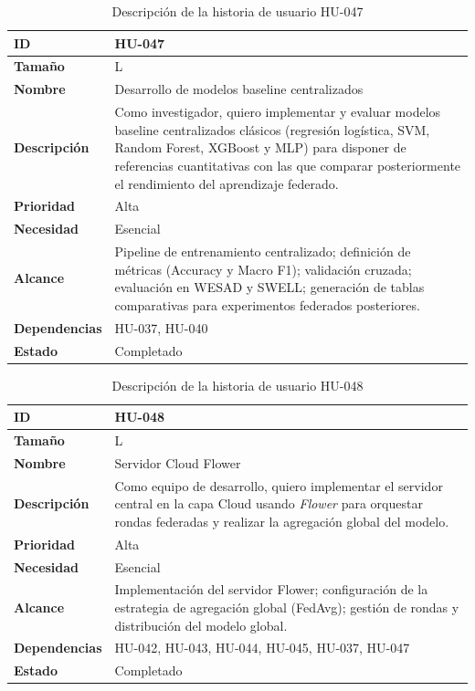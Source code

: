 \documentclass{report}
\begin{document}
\begin{table}[H]
\centering
\caption{Descripción de la historia de usuario HU-047}
\label{tab:hu047}
\begin{tabular}{|l|p{12cm}|}
\hline
\textbf{ID} & HU-047 \\ \hline
\textbf{Tamaño} & L \\ \hline
\textbf{Nombre} & Desarrollo de modelos baseline centralizados \\ \hline
\textbf{Descripción} &
Como investigador, quiero implementar y evaluar modelos baseline centralizados clásicos (regresión logística, SVM, Random Forest, XGBoost y MLP) para disponer de referencias cuantitativas con las que comparar posteriormente el rendimiento del aprendizaje federado. \\ \hline
\textbf{Prioridad} & Alta \\ \hline
\textbf{Necesidad} & Esencial \\ \hline
\textbf{Alcance} &
Pipeline de entrenamiento centralizado; definición de métricas (Accuracy y Macro F1); validación cruzada; evaluación en WESAD y SWELL; generación de tablas comparativas para experimentos federados posteriores. \\ \hline
\textbf{Dependencias} & HU-037, HU-040 \\ \hline
\textbf{Estado} & Completado \\ \hline
\end{tabular}
\end{table}



\begin{table}[H]
\centering
\caption{Descripción de la historia de usuario HU-048}
\label{tab:hu048}
\begin{tabular}{|l|p{12cm}|}
\hline
\textbf{ID} & HU-048 \\ \hline
\textbf{Tamaño} & L \\ \hline
\textbf{Nombre} & Servidor Cloud Flower \\ \hline
\textbf{Descripción} &
Como equipo de desarrollo, quiero implementar el servidor central en la capa Cloud usando \textit{Flower} para orquestar rondas federadas y realizar la agregación global del modelo. \\ \hline
\textbf{Prioridad} & Alta \\ \hline
\textbf{Necesidad} & Esencial \\ \hline
\textbf{Alcance} &
Implementación del servidor Flower; configuración de la estrategia de agregación global (FedAvg); gestión de rondas y distribución del modelo global. \\ \hline
\textbf{Dependencias} & HU-042, HU-043, HU-044, HU-045, HU-037, HU-047 \\ \hline
\textbf{Estado} & Completado \\ \hline
\end{tabular}
\end{table}
\end{document}

